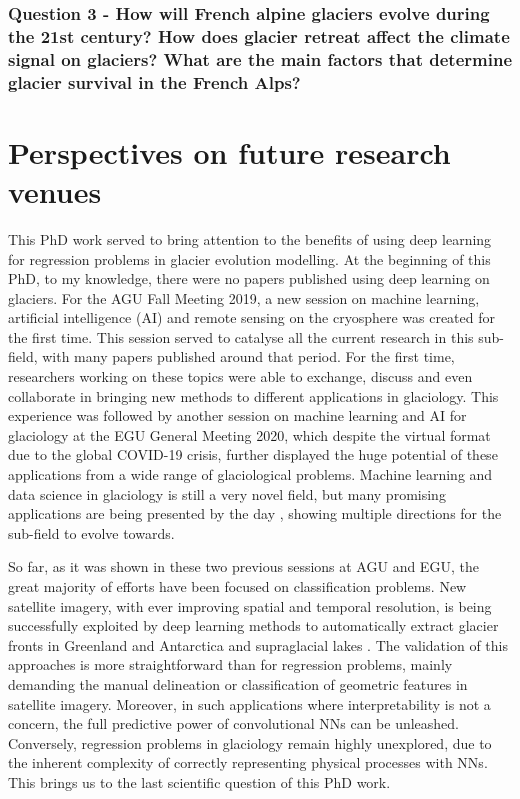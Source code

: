 \subsubsection{Question 3 - How will French alpine glaciers evolve during the 21st century? How does glacier retreat affect the climate signal on glaciers? What are the main factors that determine glacier survival in the French Alps?}

\blindtext

\section{Perspectives on future research venues}

This PhD work served to bring attention to the benefits of using deep learning for regression problems in glacier evolution modelling. At the beginning of this PhD, to my knowledge, there were no papers published using deep learning on glaciers. For the AGU Fall Meeting 2019, a new session on machine learning, artificial intelligence (AI) and remote sensing on the cryosphere was created for the first time. This session served to catalyse all the current research in this sub-field, with many papers published around that period. For the first time, researchers working on these topics were able to exchange, discuss and even collaborate in bringing new methods to different applications in glaciology. This experience was followed by another session on machine learning and AI for glaciology at the EGU General Meeting 2020, which despite the virtual format due to the global COVID-19 crisis, further displayed the huge potential of these applications from a wide range of glaciological problems. Machine learning and data science in glaciology is still a very novel field, but many promising applications are being presented by the day \citep[e.g.][]{leong_deepbedmap_2020, brinkerhoff_constraining_2020}, showing multiple directions for the sub-field to evolve towards. 

So far, as it was shown in these two previous sessions at AGU and EGU, the great majority of efforts have been focused on classification problems. New satellite imagery, with ever improving spatial and temporal resolution, is being successfully exploited by deep learning methods to automatically extract glacier fronts in Greenland and Antarctica \citep[e.g.][]{lea_google_2018,baumhoer_automated_2019,mohajerani_detection_2019, zhang_automatically_2019} and supraglacial lakes \cite[e.g.][]{yuan_automatic_2020}. The validation of this approaches is more straightforward than for regression problems, mainly demanding the manual delineation or classification of geometric features in satellite imagery. Moreover, in such applications where interpretability is not a concern, the full predictive power of convolutional NNs can be unleashed. Conversely, regression problems in glaciology remain highly unexplored, due to the inherent complexity of correctly representing physical processes with NNs. This brings us to the last scientific question of this PhD work.

